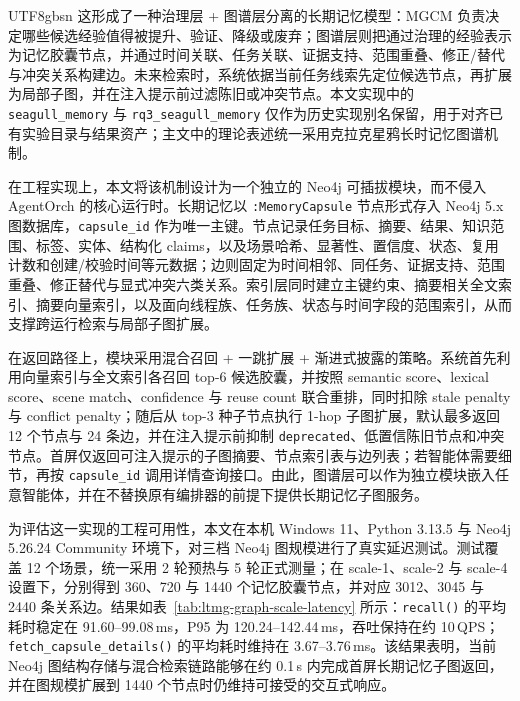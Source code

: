 \documentclass[a4paper,fleqn]{cas-sc}
\begin{document}
\begin{CJK*}{UTF8}{gbsn}
这形成了一种治理层 + 图谱层分离的长期记忆模型：MGCM 负责决定哪些候选经验值得被提升、验证、降级或废弃；图谱层则把通过治理的经验表示为记忆胶囊节点，并通过时间关联、任务关联、证据支持、范围重叠、修正/替代与冲突关系构建边。未来检索时，系统依据当前任务线索先定位候选节点，再扩展为局部子图，并在注入提示前过滤陈旧或冲突节点。本文实现中的 \texttt{seagull\_memory} 与 \texttt{rq3\_seagull\_memory} 仅作为历史实现别名保留，用于对齐已有实验目录与结果资产；主文中的理论表述统一采用克拉克星鸦长时记忆图谱机制。

在工程实现上，本文将该机制设计为一个独立的 Neo4j 可插拔模块，而不侵入 AgentOrch 的核心运行时。长期记忆以 \texttt{:MemoryCapsule} 节点形式存入 Neo4j 5.x 图数据库，\texttt{capsule\_id} 作为唯一主键。节点记录任务目标、摘要、结果、知识范围、标签、实体、结构化 claims，以及场景哈希、显著性、置信度、状态、复用计数和创建/校验时间等元数据；边则固定为时间相邻、同任务、证据支持、范围重叠、修正替代与显式冲突六类关系。索引层同时建立主键约束、摘要相关全文索引、摘要向量索引，以及面向线程族、任务族、状态与时间字段的范围索引，从而支撑跨运行检索与局部子图扩展。

在返回路径上，模块采用混合召回 + 一跳扩展 + 渐进式披露的策略。系统首先利用向量索引与全文索引各召回 top-6 候选胶囊，并按照 semantic score、lexical score、scene match、confidence 与 reuse count 联合重排，同时扣除 stale penalty 与 conflict penalty；随后从 top-3 种子节点执行 1-hop 子图扩展，默认最多返回 12 个节点与 24 条边，并在注入提示前抑制 \texttt{deprecated}、低置信陈旧节点和冲突节点。首屏仅返回可注入提示的子图摘要、节点索引表与边列表；若智能体需要细节，再按 \texttt{capsule\_id} 调用详情查询接口。由此，图谱层可以作为独立模块嵌入任意智能体，并在不替换原有编排器的前提下提供长期记忆子图服务。

为评估这一实现的工程可用性，本文在本机 Windows 11、Python 3.13.5 与 Neo4j 5.26.24 Community 环境下，对三档 Neo4j 图规模进行了真实延迟测试。测试覆盖 12 个场景，统一采用 2 轮预热与 5 轮正式测量；在 scale-1、scale-2 与 scale-4 设置下，分别得到 360、720 与 1440 个记忆胶囊节点，并对应 3012、3045 与 2440 条关系边。结果如表~\ref{tab:ltmg-graph-scale-latency} 所示：\texttt{recall()} 的平均耗时稳定在 91.60--99.08\,ms，P95 为 120.24--142.44\,ms，吞吐保持在约 10\,QPS；\texttt{fetch\_capsule\_details()} 的平均耗时维持在 3.67--3.76\,ms。该结果表明，当前 Neo4j 图结构存储与混合检索链路能够在约 0.1\,s 内完成首屏长期记忆子图返回，并在图规模扩展到 1440 个节点时仍维持可接受的交互式响应。


\end{CJK*}
\end{document}
